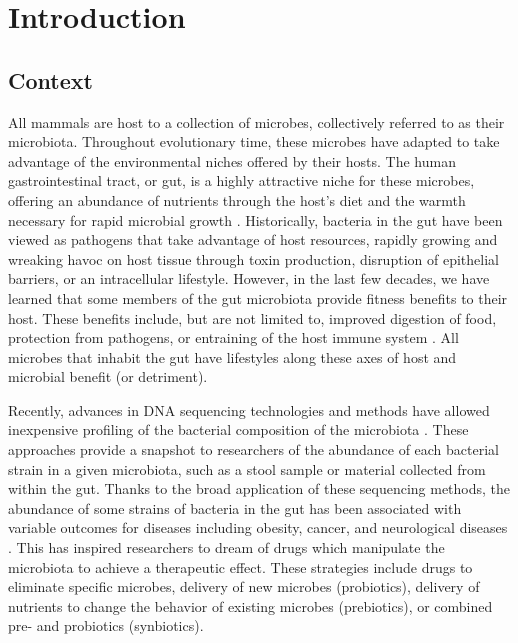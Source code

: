 \documentclass[11pt,onecolumn,notitlepage,openany,twoside]{book}
\begin{document}
\chapter{Introduction}
\begin{refsection}

\section{Context}

All mammals are host to a collection of microbes, collectively referred to as their microbiota. Throughout evolutionary time, these microbes have adapted to take advantage of the environmental niches offered by their hosts. The human gastrointestinal tract, or gut, is a highly attractive niche for these microbes, offering an abundance of nutrients through the host’s diet and the warmth necessary for rapid microbial growth \cite{Turnbaugh2007-cd}. Historically, bacteria in the gut have been viewed as pathogens that take advantage of host resources, rapidly growing and wreaking havoc on host tissue through toxin production, disruption of epithelial barriers, or an intracellular lifestyle. However, in the last few decades, we have learned that some members of the gut microbiota provide fitness benefits to their host. These benefits include, but are not limited to, improved digestion of food, protection from pathogens, or entraining of the host immune system \cite{Britton2014-wm,Buffie2013-xt,Wilson1988-ed,Stecher2008-bc,Lawley2013-ez,Gillis2018-mt}. All microbes that inhabit the gut have lifestyles along these axes of host and microbial benefit (or detriment).

Recently, advances in DNA sequencing technologies and methods have allowed inexpensive profiling of the bacterial composition of the microbiota \cite{Turnbaugh2007-cd}. These approaches provide a snapshot to researchers of the abundance of each bacterial strain in a given microbiota, such as a stool sample or material collected from within the gut. Thanks to the broad application of these sequencing methods, the abundance of some strains of bacteria in the gut has been associated with variable outcomes for diseases including obesity, cancer, and neurological diseases \cite{Young2017-xs}. This has inspired researchers to dream of drugs which manipulate the microbiota to achieve a therapeutic effect. These strategies include drugs to eliminate specific microbes, delivery of new microbes (probiotics), delivery of nutrients to change the behavior of existing microbes (prebiotics), or combined pre- and probiotics (synbiotics)\cite{OToole2017-th}.


\end{refsection}
\end{document}
